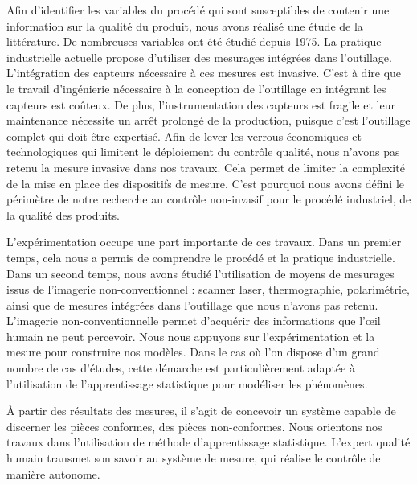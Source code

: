 Afin d'identifier les variables du procédé qui sont susceptibles de contenir une information sur la qualité du produit, nous avons réalisé une étude de la littérature.
De nombreuses variables ont été étudié depuis 1975.
La pratique industrielle actuelle propose d'utiliser des mesurages intégrées dans l'outillage.
L'intégration des capteurs nécessaire à ces mesures est invasive.
C'est à dire que le travail d'ingénierie nécessaire à la conception de l'outillage en intégrant les capteurs est coûteux.
De plus, l'instrumentation des capteurs est fragile et leur maintenance nécessite un arrêt prolongé de la production, puisque c'est l'outillage complet qui doit être expertisé.
Afin de lever les verrous économiques et technologiques qui limitent le déploiement du contrôle qualité, nous n'avons pas retenu la mesure invasive dans nos travaux.
Cela permet de limiter la complexité de la mise en place des dispositifs de mesure.
C'est pourquoi nous avons défini le périmètre de notre recherche au contrôle non-invasif pour le procédé industriel, de la qualité des produits.

L'expérimentation occupe une part importante de ces travaux.
Dans un premier temps, cela nous a permis de comprendre le procédé et la pratique industrielle.
Dans un second temps, nous avons étudié l'utilisation de moyens de mesurages issus de l'imagerie non-conventionnel : scanner laser, thermographie, polarimétrie, ainsi que de mesures intégrées dans l'outillage que nous n'avons pas retenu.
L'imagerie non-conventionnelle permet d'acquérir des informations que l'œil humain ne peut percevoir. %
Nous nous appuyons sur l'expérimentation et la mesure pour construire nos modèles.  %
Dans le cas où l'on dispose d'un grand nombre de cas d'études, cette démarche est particulièrement adaptée à l'utilisation de l'apprentissage statistique pour modéliser les phénomènes.

À partir des résultats des mesures, il s'agit de concevoir un système capable de discerner les pièces conformes, des pièces non-conformes.
Nous orientons nos travaux dans l'utilisation de méthode d'apprentissage statistique.
L'expert qualité humain transmet son savoir au système de mesure, qui réalise le contrôle de manière autonome.

